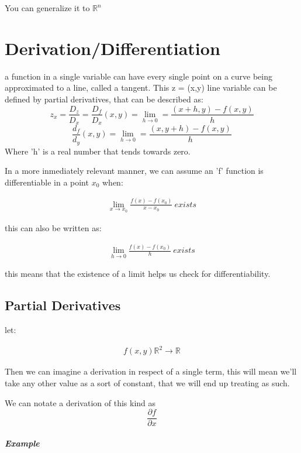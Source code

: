 \documentclass[11pt,fleqn]{book} %
\begin{document}
You can generalize it to $\mathbb{R}^n$

\chapter{Derivation/Differentiation}

a function in a single variable can have every single point on a curve being approximated to
a line, called a tangent. This z = (x,y) line variable can be defined by partial derivatives, that
can be described as:
\begin{equation}
    z_x = \frac{D_z}{D_x} = \frac{D_f}{D_x} (x,y) = \lim_{h \to 0} = \frac{(x+h,y)-f(x,y)}{h} 
\end{equation}
\begin{equation}
    \frac{d_f}{d_y}(x,y) = \lim_{h \to 0} = \frac{(x,y+h)-f(x,y)}{h}
\end{equation}
Where 'h' is a real number that tends towards zero.

In a more inmediately relevant manner, we can assume an 'f' function is differentiable in a point $x_0$ when:

\begin{gather}
    \lim_{x \to x_0} \frac{f(x)- f(x_0)}{x - x_0} \ exists 
\end{gather}

this can also be written as:

\begin{gather}
    \lim_{h \to 0} \frac{f(x)- f(x_0)}{h} \ exists 
\end{gather}

this means that the existence of a limit helps us check for differentiability.

\section{Partial Derivatives}

let:

\begin{gather}
    f(x,y) \mathbb{R}^2 \to \mathbb{R}
\end{gather}

Then we can imagine a derivation in respect of a single term, this will mean we'll take any 
other value as a sort of constant, that we will end up treating as such.

We can notate a derivation of this kind as $$\frac{\partial f}{\partial x}$$

\paragraph{Example}
\end{document}
